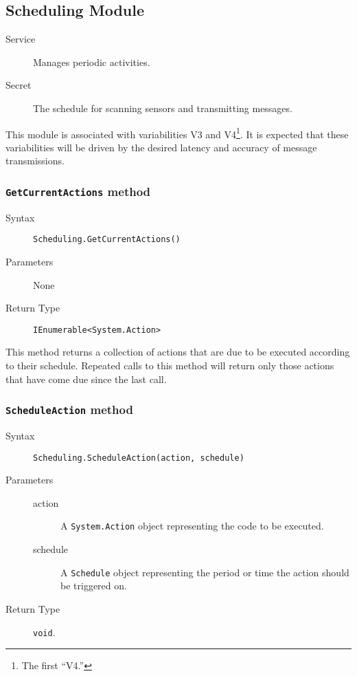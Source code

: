 \documentclass[letterpaper,11pt]{article}
\begin{document}
\subsection{Scheduling Module}
\begin{description}
\item[Service] Manages periodic activities.
\item[Secret] The schedule for scanning sensors and transmitting messages.
\end{description}
This module is associated with variabilities V3 and V4\footnote{The first ``V4.''}.  It is expected that these variabilities will be driven by the desired latency and accuracy of message transmissions.

\subsubsection{\texttt{GetCurrentActions} method}
\begin{description}
\item[Syntax] \texttt{Scheduling.GetCurrentActions()}
\item[Parameters] None
\item[Return Type] \texttt{IEnumerable<System.Action>}
\end{description}

This method returns a collection of actions that are due to be executed according to their schedule.  Repeated calls to this method will return only those actions that have come due since the last call.

\subsubsection{\texttt{ScheduleAction} method}
\begin{description}
\item[Syntax] \texttt{Scheduling.ScheduleAction(action, schedule)}
\item[Parameters] \hfill
  \begin{description}
  \item[action] A \texttt{System.Action} object representing the code to be executed.
  \item[schedule] A \texttt{Schedule} object representing the period or time the action should be triggered on.
  \end{description}
\item[Return Type] \texttt{void}.
\end{description}
\end{document}
